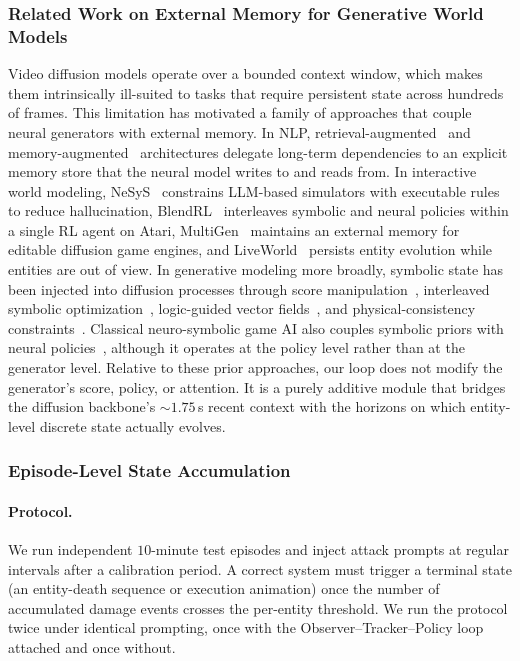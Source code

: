 \subsubsection{Related Work on External Memory for Generative World Models}
\label{app:external_memory_rw}

Video diffusion models operate over a bounded context window, which makes them intrinsically ill-suited to tasks that require persistent state across hundreds of frames. This limitation has motivated a family of approaches that couple neural generators with external memory.
In NLP, retrieval-augmented~\citep{lewis2020retrieval} and memory-augmented~\citep{weston2014memory} architectures delegate long-term dependencies to an explicit memory store that the neural model writes to and reads from.
In interactive world modeling, NeSyS~\citep{zhao2026nesys} constrains LLM-based simulators with executable rules to reduce hallucination, BlendRL~\citep{shindo2025blendrl} interleaves symbolic and neural policies within a single RL agent on Atari, MultiGen~\citep{po2026multigen} maintains an external memory for editable diffusion game engines, and LiveWorld~\citep{duan2026liveworld} persists entity evolution while entities are out of view.
In generative modeling more broadly, symbolic state has been injected into diffusion processes through score manipulation~\citep{scassola2025zeroshotns}, interleaved symbolic optimization~\citep{christopher2025nsd}, logic-guided vector fields~\citep{baheri2026lgvf}, and physical-consistency constraints~\citep{lin2025physar}.
Classical neuro-symbolic game AI also couples symbolic priors with neural policies~\citep{garcez2022neural, silver2016mastering, vinyals2019grandmaster}, although it operates at the policy level rather than at the generator level.
Relative to these prior approaches, our loop does not modify the generator's score, policy, or attention. It is a purely additive module that bridges the diffusion backbone's ${\sim}1.75$\,s recent context with the horizons on which entity-level discrete state actually evolves.

\subsubsection{Episode-Level State Accumulation}
\label{app:neuro_eval}

\paragraph{Protocol.}
We run independent $10$-minute test episodes and inject attack prompts at regular intervals after a calibration period. A correct system must trigger a terminal state (an entity-death sequence or execution animation) once the number of accumulated damage events crosses the per-entity threshold. We run the protocol twice under identical prompting, once with the Observer--Tracker--Policy loop attached and once without.

